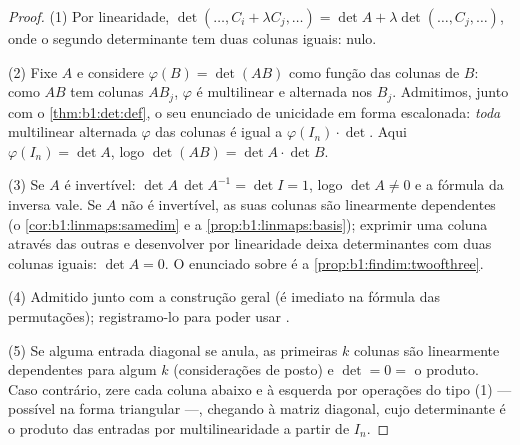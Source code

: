 \begin{proof}
(1) Por linearidade, $\det(\dots, C_i + \lambda C_j, \dots) = \det A +
\lambda\det(\dots, C_j, \dots)$, onde o segundo determinante tem duas
colunas iguais: nulo.

(2) Fixe $A$ e considere $\varphi(B) = \det(AB)$ como função das colunas de $B$: como
$AB$ tem colunas $AB_j$, $\varphi$ é multilinear e alternada nos
$B_j$. Admitimos, junto com o \cref{thm:b1:det:def}, o seu enunciado de unicidade em
forma escalonada: \emph{toda}  multilinear alternada
$\varphi$ das colunas é igual a $\varphi(I_n) \cdot \det$. Aqui $\varphi(I_n) = \det A$, logo $\det(AB) = \det A \cdot \det B$.

(3) Se $A$ é invertível: $\det A\,\det A^{-1} = \det I = 1$, logo $\det A \neq 0$ e a fórmula da inversa
vale. Se $A$ não é invertível, as suas colunas são linearmente
dependentes (o \cref{cor:b1:linmaps:samedim} e a \cref{prop:b1:linmaps:basis}); exprimir uma coluna através das
outras e desenvolver por linearidade deixa determinantes com duas
colunas iguais: $\det A = 0$. O enunciado sobre  é a \cref{prop:b1:findim:twoofthree}.

(4) Admitido junto com a construção geral (é imediato na fórmula das
permutações); registramo-lo para poder usar .

(5) Se alguma entrada diagonal se anula, as primeiras $k$ colunas
são linearmente dependentes para algum $k$ (considerações de posto)
e $\det = 0 = $ o produto. Caso contrário, zere cada coluna abaixo e à
esquerda por operações do tipo (1) --- possível na forma triangular
---, chegando à matriz diagonal, cujo determinante é o produto das
entradas por multilinearidade a partir de $I_n$.
\end{proof}

